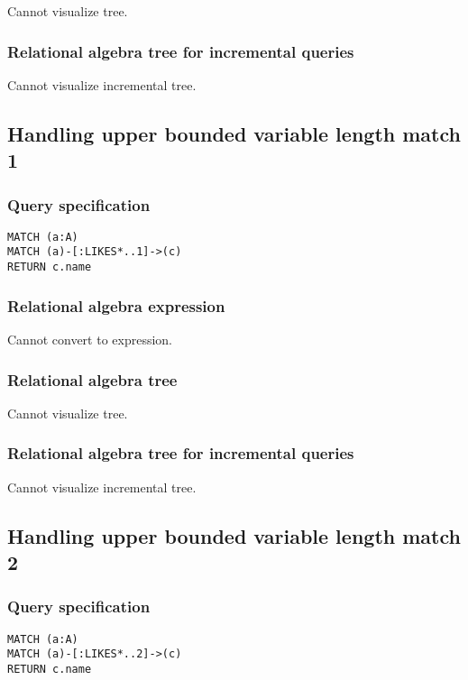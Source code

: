 Cannot visualize tree.

\subsubsection*{Relational algebra tree for incremental queries}

Cannot visualize incremental tree.

\subsection{Handling upper bounded variable length match 1}

\subsubsection*{Query specification}

\begin{lstlisting}
MATCH (a:A)
MATCH (a)-[:LIKES*..1]->(c)
RETURN c.name
\end{lstlisting}

\subsubsection*{Relational algebra expression}

Cannot convert to expression.

\subsubsection*{Relational algebra tree}

Cannot visualize tree.

\subsubsection*{Relational algebra tree for incremental queries}

Cannot visualize incremental tree.

\subsection{Handling upper bounded variable length match 2}

\subsubsection*{Query specification}

\begin{lstlisting}
MATCH (a:A)
MATCH (a)-[:LIKES*..2]->(c)
RETURN c.name
\end{lstlisting}

